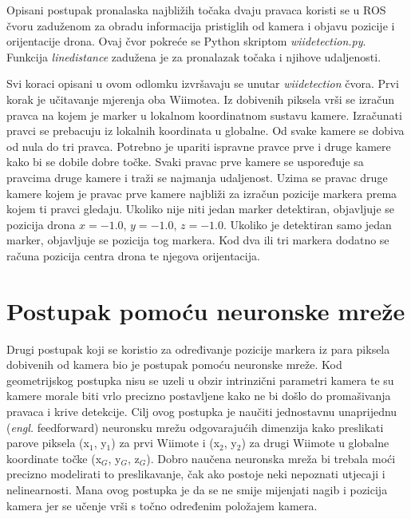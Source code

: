 \documentclass[times, utf8, diplomski]{fer}
\begin{document}
\vspace{5mm}
 
Opisani postupak pronalaska najbližih točaka dvaju pravaca koristi se u ROS čvoru zaduženom za obradu informacija pristiglih od kamera i objavu pozicije i orijentacije drona. Ovaj čvor pokreće se Python skriptom \textit{wii\textunderscore detection.py}. Funkcija \textit{line\textunderscore distance} zadužena je za pronalazak točaka i njihove udaljenosti.

Svi koraci opisani u ovom odlomku izvršavaju se unutar \textit{wii\textunderscore detection} čvora. Prvi korak je učitavanje mjerenja oba Wiimotea. Iz dobivenih piksela vrši se izračun pravca na kojem je marker u lokalnom koordinatnom sustavu kamere. Izračunati pravci se prebacuju iz lokalnih koordinata u globalne. Od svake kamere se dobiva od nula do tri pravca. Potrebno je upariti ispravne pravce prve i druge kamere kako bi se dobile dobre točke. Svaki pravac prve kamere se uspoređuje sa pravcima druge kamere i traži se najmanja udaljenost. Uzima se pravac druge kamere kojem je pravac prve kamere najbliži za izračun pozicije markera prema kojem ti pravci gledaju. Ukoliko nije niti jedan marker detektiran, objavljuje se pozicija drona $x=-1.0$, $y=-1.0$, $z=-1.0$. Ukoliko je detektiran samo jedan marker, objavljuje se pozicija tog markera. Kod dva ili tri markera dodatno se računa pozicija centra drona te njegova orijentacija.
 
\section{Postupak pomoću neuronske mreže}

Drugi postupak koji se koristio za određivanje pozicije markera iz para piksela dobivenih od kamera bio je postupak pomoću neuronske mreže. Kod geometrijskog postupka nisu se uzeli u obzir intrinzični parametri kamera te su kamere morale biti vrlo precizno postavljene kako ne bi došlo do promašivanja pravaca i krive detekcije. Cilj ovog postupka je naučiti jednostavnu unaprijednu (\textit{engl.} feedforward) neuronsku mrežu odgovarajućih dimenzija kako preslikati parove piksela (x$_1$, y$_1$) za prvi Wiimote i (x$_2$, y$_2$) za drugi Wiimote u globalne koordinate točke (x$_G$, y$_G$, z$_G$). Dobro naučena neuronska mreža bi trebala moći precizno modelirati to preslikavanje, čak ako postoje neki nepoznati utjecaji i nelinearnosti. Mana ovog postupka je da se ne smije mijenjati nagib i pozicija kamera jer se učenje vrši s točno određenim položajem kamera.
\end{document}
